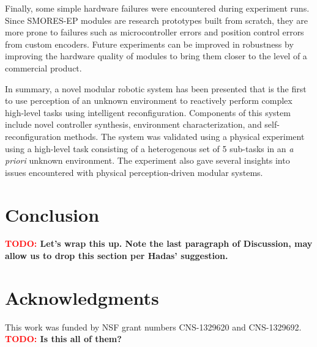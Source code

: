 \documentclass[conference]{IEEEtran}
\newcommand{\TODO}[1]{ {\bf \textcolor{red}{TODO:} #1 }}
\begin{document}
Finally, some simple hardware failures were encountered during experiment runs. Since SMORES-EP modules are research prototypes built from scratch, they are more prone to failures such as microcontroller errors and position control errors from custom encoders. Future experiments can be improved in robustness by improving the hardware quality of modules to bring them closer to the level of a commercial product.

In summary, a novel modular robotic system has been presented that is the first to use perception of an unknown environment to reactively perform complex high-level tasks using intelligent reconfiguration. Components of this system include novel controller synthesis, environment characterization, and self-reconfiguration methods. The system was validated using a physical experiment using a high-level task consisting of a heterogenous set of 5 sub-tasks in an \textit{a priori} unknown environment. The experiment also gave several insights into issues encountered with physical perception-driven modular systems.

\section{Conclusion} \label{sec:conclusion}
%
\TODO{Let's wrap this up. Note the last paragraph of Discussion, may allow us to drop this section per Hadas' suggestion.}

\section*{Acknowledgments}
%
This work was funded by NSF grant numbers CNS-1329620 and CNS-1329692.
\TODO{Is this all of them?}





\end{document}
